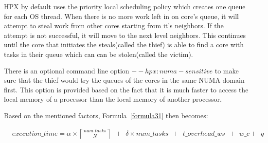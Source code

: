 HPX by default uses the priority local scheduling policy which creates one queue for each OS thread. When there is no more work left in on core's queue, it will attempt to steal work from other cores starting from it's neighbors. If the attempt is not successful, it will move to the next level neighbors. This continues until the core that initiates the steals(called the thief) is able to find a core with tasks in their queue which can can be stolen(called the victim). 

There is an optional command line option ${--hpx:numa-sensitive}$ to make sure that the thief would try the queues of the cores in the same NUMA domain first. This option is provided based on the fact that it is much faster to access the local memory of a processor than the local memory of another processor.  
  
Based on the mentioned factors, Formula~\ref{formula31} then becomes:

\begin{equation}\label{formula32}
\begin{aligned}
&execution\_time = 
\alpha\times{\left\lceil{\frac{num\_{tasks}}{N}}\right\rceil\:\:+\:\:\delta\times{num\_{tasks}}\:\:+\:\:t\_{overhead\_{ws}}\:\:+\:\:w\_c+\:\:q}
\end{aligned}
\end{equation}



 

  




